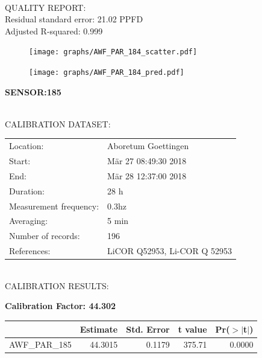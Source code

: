 \documentclass[oneside]{report}
\begin{document}
\hrulefill\\
QUALITY REPORT:\\
Residual standard error: 21.02 PPFD\\
Adjusted R-squared: 0.999



\begin{figure}[H]
  \centering
  \texttt{[image: graphs/AWF\_PAR\_184\_scatter.pdf]}
\end{figure}




\begin{figure}[H]
  \centering
  \texttt{[image: graphs/AWF\_PAR\_184\_pred.pdf]}
\end{figure}

\pagebreak


\begin{center}
\large{\textbf{SENSOR:185}}\\
\end{center}

\hrulefill\\
CALIBRATION DATASET:\\
\begin{table}[h!]
  \centering
  \label{tab:table1}
  \begin{tabular}{ll}
    Location: & Aboretum Goettingen\\ 
    
    
    Start:  & Mär 27 08:49:30 2018 \\
    End:   & Mär 28 12:37:00 2018\\ 
    Duration: & 28 h\\
    Measurement frequency: & 0.3hz\\
    Averaging:  &5 min\\
    Number of records: & 196 \\
    References: & LiCOR Q52953, Li-COR Q 52953 \\
  \end{tabular}
\end{table}

\hrulefill\\
CALIBRATION RESULTS:\\


\begin{center}
\textbf{\large{Calibration Factor: 44.302}}\\
\end{center}
\begin{table}[ht]
\centering
\begin{tabular}{rrrrr}
  \hline
 & Estimate & Std. Error & t value & Pr($>$$|$t$|$) \\ 
  \hline
AWF\_PAR\_185 & 44.3015 & 0.1179 & 375.71 & 0.0000 \\ 
   \hline
\end{tabular}
\end{table}
\end{document}

